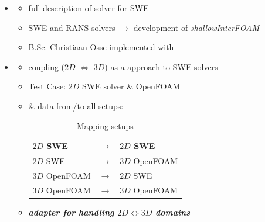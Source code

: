 \begin{frame}

\begin{multicols}{2}
\begin{itemize}
\item<2->[]    
 \vspace{3em}
 \begin{itemize}
  \setlength\itemsep{2em}
  \item  full description of   solver for  SWE \cite{mintgen}
 \item  {} SWE and  RANS solvers $\rightarrow$ development of \textit{shallowInterFOAM} \cite{mintgen}
 \item B.Sc. Christiaan Osse implemented \cite{mintgen} with 
 \end{itemize}
    
\vfill\columnbreak

\item<3->[]
\vspace{3em}
 \begin{itemize}
    \setlength\itemsep{2em}

 \item<4->  \cite{mintgen} coupling ($2D$ $\Longleftrightarrow$ $3D$) as a  approach to SWE solvers
 \item<5-> Test Case: $2D$ SWE solver \& OpenFOAM 
 \item<6->  \&  data from/to all setups: \vspace{0.4cm}
\begin{table}[]
\begin{tabular}{|lll|}\hline
$2D$ SWE       & $\rightarrow$ & $2D$ SWE       \\ \hline
$2D$ SWE       & $\rightarrow$ & $3D$ OpenFOAM \\ \hline
$3D$ OpenFOAM & $\rightarrow$ & $2D$ SWE       \\ \hline
$3D$ OpenFOAM & $\rightarrow$ & $3D$ OpenFOAM \\ \hline
\end{tabular}
\caption{Mapping setups}
\label{table:1}
\end{table}
\item<7-> \textbf{\textit{ adapter for handling $2D\Longleftrightarrow3D$ domains}}
\end{itemize}
\end{itemize}
\end{multicols}


\end{frame}


